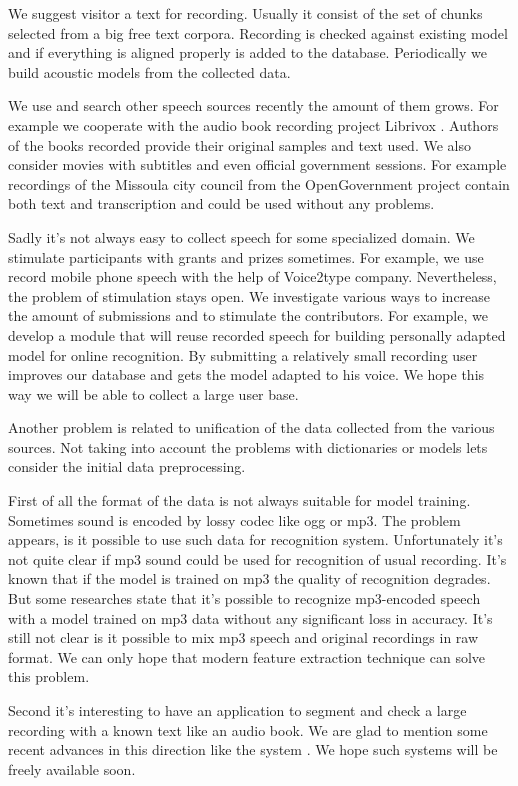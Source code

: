 \documentclass[runningheads]{llncs}
\begin{document}
We suggest visitor a text for recording. Usually it consist of the set
of chunks selected from a big free text corpora. Recording is checked
against existing model and if everything is aligned properly is added to
the database. Periodically we build acoustic models from the collected
data.

We use and search other speech sources recently the amount of them
grows. For example we cooperate with the audio book recording project
Librivox \cite{librivox}. Authors of the books recorded provide their
original samples and text used. We also consider movies with subtitles
and even official government sessions. For example recordings of the
Missoula city council from the OpenGovernment project contain both text
and transcription and could be used without any problems.


Sadly it's not always easy to collect speech for some specialized
domain. We stimulate participants with grants and prizes sometimes. For
example, we use record mobile phone speech with the help of Voice2type
company. Nevertheless, the problem of stimulation stays open. We
investigate various ways to increase the amount of submissions and to
stimulate the  contributors. For example, we develop a module that will
reuse recorded speech for building personally adapted model for online
recognition. By submitting  a relatively small recording user improves
our database and gets the  model adapted to his voice. We hope this way
we will be able to collect a large user base.

Another problem is related to unification of the data collected from 
the various sources. Not taking into account the problems with dictionaries
or models lets consider the initial data preprocessing.

First of all the format of the data is not always suitable for model
training. Sometimes sound is encoded by lossy codec like ogg or mp3.
The problem appears, is it possible to use such data for recognition
system. Unfortunately it's not quite clear if mp3 sound could be used for
recognition of usual recording. It's known that if the model is trained on mp3
the quality of recognition degrades. But some researches state
that it's possible to recognize mp3-encoded speech with a model trained
on mp3 data without any significant loss in accuracy. It's still not
clear is it possible to mix mp3 speech and original recordings in raw format.
We can only hope that modern feature extraction technique can solve this problem.

Second it's interesting to have an application to segment and check a large recording
with a known text like an audio book. We are glad to mention some recent advances
in this direction like the system \cite{kishore}. We hope such systems will 
be freely available soon.
\end{document}
